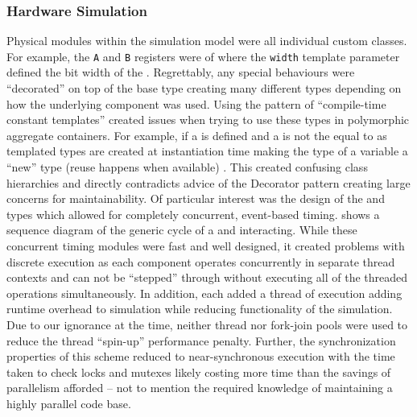 \subsubsection{Hardware Simulation}
\label{sec:hc12sim:sec:hardware-simulation}

Physical modules within the simulation model were all individual custom classes. For example, the \verb|A| and \verb|B| registers were of  where the \verb|width| template parameter defined the bit width of the . Regrettably, any special behaviours were ``decorated'' on top of the base type creating many different types depending on how the underlying component was used. Using the pattern of ``compile-time constant templates'' created issues when trying to use these types in polymorphic aggregate containers. For example, if a  is defined and a   is not the equal to  as templated types are created at instantiation time making the type of a variable a ``new'' type (reuse happens when available) \cite{cppreference:class-template}. This created confusing class hierarchies and directly contradicts advice of the Decorator pattern \cite[p.~175]{go4} creating large concerns for maintainability. Of particular interest was the design of the  and  types which allowed for completely concurrent, event-based timing.  shows a sequence diagram of the generic cycle of a  and  interacting. While these concurrent timing modules were fast and well designed, it created problems with discrete execution as each component operates concurrently in separate thread contexts and can not be ``stepped'' through without executing all of the threaded operations simultaneously. In addition, each  added a thread of execution adding runtime overhead to simulation while reducing functionality of the simulation. Due to our ignorance at the time, neither thread nor fork-join pools were used to reduce the thread ``spin-up'' performance penalty. Further, the synchronization properties of this scheme reduced to near-synchronous execution with the time taken to check locks and mutexes likely costing more time than the savings of parallelism afforded -- not to mention the required knowledge of maintaining a highly parallel code base.

